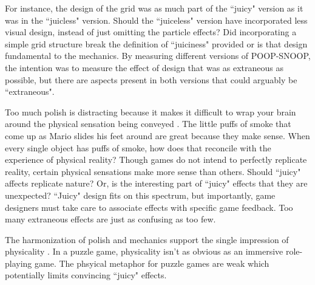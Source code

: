 For instance, the design of the grid was as much part of the ``juicy" version as it was in the ``juicless" version. Should the ``juiceless" version have incorporated less visual design, instead of just omitting the particle effects? Did incorporating a simple grid structure break the definition of ``juiciness" provided or is that design fundamental to the mechanics. By measuring different versions of POOP-SNOOP, the intention was to measure the effect of design that was as extraneous as possible, but there are aspects present in both versions that could arguably be ``extraneous". 

Too much polish is distracting because it makes it difficult to wrap your brain around the physical sensation being conveyed \cite{swink2009game}. The little puffs of smoke that come up as Mario slides his feet around are great because they make sense. When every single object has puffs of smoke, how does that reconcile with the experience of physical reality? Though games do not intend to perfectly replicate reality, certain physical sensations make more sense than others. Should ``juicy" affects replicate nature? Or, is the interesting part of ``juicy" effects that they are unexpected? ``Juicy" design fits on this spectrum, but importantly, game designers must take care to associate effects with specific game feedback. Too many extraneous effects are just as confusing as too few.

The harmonization of polish and mechanics support the single impression of physicality \cite{swink2009game}. In a puzzle game, physicality isn't as obvious as an immersive role-playing game. The phsyical metaphor for puzzle games are weak which potentially limits convincing ``juicy" effects. 
